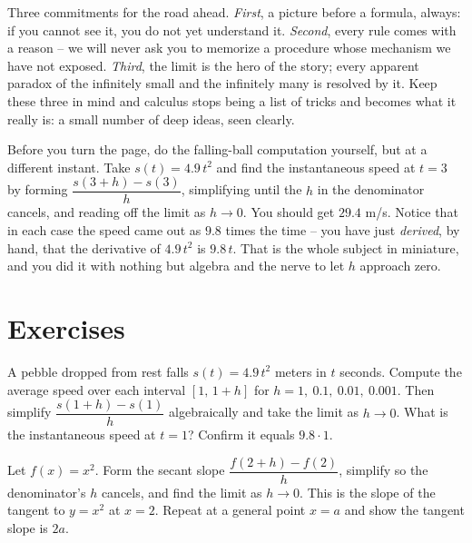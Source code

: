 \begin{focusbox}
Three commitments for the road ahead. \emph{First}, a picture before a formula,
always: if you cannot see it, you do not yet understand it. \emph{Second}, every
rule comes with a reason -- we will never ask you to memorize a procedure whose
mechanism we have not exposed. \emph{Third}, the limit is the hero of the story;
every apparent paradox of the infinitely small and the infinitely many is
resolved by it. Keep these three in mind and calculus stops being a list of
tricks and becomes what it really is: a small number of deep ideas, seen clearly.
\end{focusbox}

\begin{labbox}
Before you turn the page, do the falling-ball computation yourself, but at a
different instant. Take $s(t) = 4.9\,t^2$ and find the instantaneous speed at
$t = 3$ by forming $\dfrac{s(3+h)-s(3)}{h}$, simplifying until the $h$ in the
denominator cancels, and reading off the limit as $h\to 0$. You should get
$29.4$ m/s. Notice that in each case the speed came out as $9.8$ times the time
-- you have just \emph{derived}, by hand, that the derivative of $4.9\,t^2$ is
$9.8\,t$. That is the whole subject in miniature, and you did it with nothing but
algebra and the nerve to let $h$ approach zero.
\end{labbox}

\section*{Exercises}

\begin{exercise}
A pebble dropped from rest falls $s(t) = 4.9\,t^2$ meters in $t$ seconds.
Compute the average speed over each interval $[1,\,1+h]$ for $h = 1,\ 0.1,\
0.01,\ 0.001$. Then simplify $\dfrac{s(1+h)-s(1)}{h}$ algebraically and take the
limit as $h \to 0$. What is the instantaneous speed at $t=1$? Confirm it equals
$9.8\cdot 1$.
\end{exercise}

\begin{exercise}
Let $f(x) = x^2$. Form the secant slope $\dfrac{f(2+h)-f(2)}{h}$, simplify so the
denominator's $h$ cancels, and find the limit as $h\to 0$. This is the slope of
the tangent to $y=x^2$ at $x=2$. Repeat at a general point $x=a$ and show the
tangent slope is $2a$.
\end{exercise}

